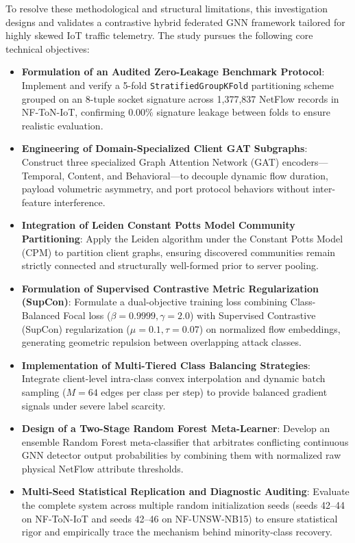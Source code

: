 \documentclass[12pt,a4paper]{report}
\begin{document}
To resolve these methodological and structural limitations, this investigation designs and validates a contrastive hybrid federated GNN framework tailored for highly skewed IoT traffic telemetry. The study pursues the following core technical objectives:
\begin{itemize}
    \item \textbf{Formulation of an Audited Zero-Leakage Benchmark Protocol}: Implement and verify a 5-fold \texttt{StratifiedGroupKFold} partitioning scheme grouped on an 8-tuple socket signature across 1,377,837 NetFlow records in NF-ToN-IoT, confirming $0.00\%$ signature leakage between folds to ensure realistic evaluation.
    \item \textbf{Engineering of Domain-Specialized Client GAT Subgraphs}: Construct three specialized Graph Attention Network (GAT) encoders---Temporal, Content, and Behavioral---to decouple dynamic flow duration, payload volumetric asymmetry, and port protocol behaviors without inter-feature interference.
    \item \textbf{Integration of Leiden Constant Potts Model Community Partitioning}: Apply the Leiden algorithm under the Constant Potts Model (CPM) to partition client graphs, ensuring discovered communities remain strictly connected and structurally well-formed prior to server pooling.
    \item \textbf{Formulation of Supervised Contrastive Metric Regularization (SupCon)}: Formulate a dual-objective training loss combining Class-Balanced Focal loss ($\beta=0.9999, \gamma=2.0$) with Supervised Contrastive (SupCon) regularization ($\mu=0.1, \tau=0.07$) on normalized flow embeddings, generating geometric repulsion between overlapping attack classes.
    \item \textbf{Implementation of Multi-Tiered Class Balancing Strategies}: Integrate client-level intra-class convex interpolation and dynamic batch sampling ($M=64$ edges per class per step) to provide balanced gradient signals under severe label scarcity.
    \item \textbf{Design of a Two-Stage Random Forest Meta-Learner}: Develop an ensemble Random Forest meta-classifier that arbitrates conflicting continuous GNN detector output probabilities by combining them with normalized raw physical NetFlow attribute thresholds.
    \item \textbf{Multi-Seed Statistical Replication and Diagnostic Auditing}: Evaluate the complete system across multiple random initialization seeds (seeds 42--44 on NF-ToN-IoT and seeds 42--46 on NF-UNSW-NB15) to ensure statistical rigor and empirically trace the mechanism behind minority-class recovery.
\end{itemize}
\end{document}
